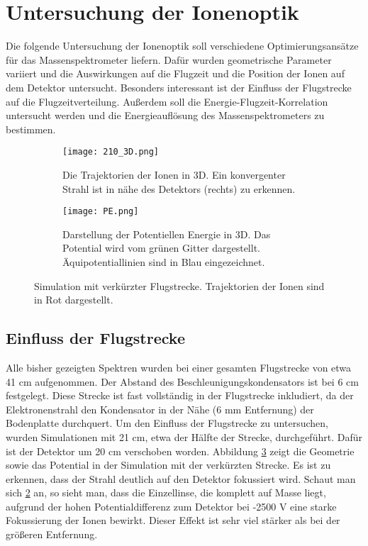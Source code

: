 \section{Untersuchung der Ionenoptik}
Die folgende Untersuchung der Ionenoptik soll verschiedene Optimierungsansätze für das Massenspektrometer liefern. Dafür wurden geometrische Parameter variiert und die Auswirkungen auf die Flugzeit und die Position der Ionen auf dem Detektor untersucht. Besonders interessant ist der Einfluss der Flugstrecke auf die Flugzeitverteilung. Außerdem soll die Energie-Flugzeit-Korrelation untersucht werden und die Energieauflösung des Massenspektrometers zu bestimmen.

\begin{figure}
    \centering
    \begin{subfigure}{.9\textwidth}
        \centering
        \texttt{[image: 210\_3D.png]}
        \caption{Die Trajektorien der Ionen in 3D. Ein konvergenter Strahl ist in nähe des Detektors (rechts) zu erkennen.}
        \label{fig:210}
    \end{subfigure}%
    \vfill
    \begin{subfigure}{.9\textwidth}
        \centering
        \texttt{[image: PE.png]}
        \caption{Darstellung der Potentiellen Energie in 3D. Das Potential wird vom grünen Gitter dargestellt. Äquipotentiallinien sind in Blau eingezeichnet.}
        \label{fig:PE}
    \end{subfigure}
    \caption[Simulation mit verkürzter Flugstrecke]{Simulation mit verkürzter Flugstrecke. Trajektorien der Ionen sind in Rot dargestellt.}
    \label{fig:210_PE}
\end{figure}

\subsection{Einfluss der Flugstrecke}
Alle bisher gezeigten Spektren wurden bei einer gesamten Flugstrecke von etwa 41 cm aufgenommen. Der Abstand des Beschleunigungskondensators ist bei 6 cm festgelegt. Diese Strecke ist fast vollständig in der Flugstrecke inkludiert, da der Elektronenstrahl den Kondensator in der Nähe (6 mm Entfernung) der Bodenplatte durchquert. Um den Einfluss der Flugstrecke zu untersuchen, wurden Simulationen mit 21 cm, etwa der Hälfte der Strecke, durchgeführt. Dafür ist der Detektor um 20 cm verschoben worden. Abbildung \ref{fig:210_PE} zeigt die Geometrie sowie das Potential in der Simulation mit der verkürzten Strecke. Es ist zu erkennen, dass der Strahl deutlich auf den Detektor fokussiert wird. Schaut man sich \ref{fig:PE} an, so sieht man, dass die Einzellinse, die komplett auf Masse liegt, aufgrund der hohen Potentialdifferenz zum Detektor bei -2500 V eine starke Fokussierung der Ionen bewirkt. Dieser Effekt ist sehr viel stärker als bei der größeren Entfernung. 

